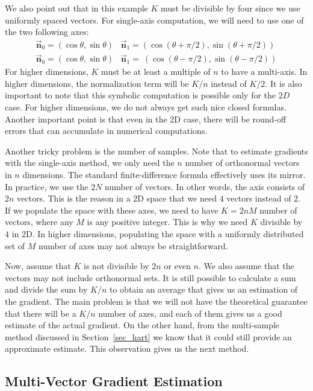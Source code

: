 \documentclass{article}
\begin{document}
We also point out that in this example $K$ must be divisible by four since we use uniformly spaced vectors. For single-axis computation, we will need to use one of the two following axes:
\begin{eqnarray}
\vec{\mathbf{n}}_0 = \left(\cos \theta, \sin \theta \right) \; \; \; \vec{\mathbf{n}}_1 =\left( \cos (\theta+\pi/2), \sin (\theta+\pi/2) \right) \nonumber \\
\vec{\mathbf{n}}_0 =\left( \cos \theta, \sin \theta \right) \; \; \; \vec{\mathbf{n}}_1 =\ \left( \cos (\theta-\pi/2), \sin (\theta-\pi/2) \right)
\end{eqnarray} 
For higher dimensions, $K$ must be at least a multiple of $n$ to have a multi-axis. In higher dimensions, the normalization term will be $K/n$ instead of $K/2$. It is also important to note that this symbolic computation is possible only for the $2D$ case. For higher dimensions, we do not always get such nice closed formulas. Another important point is that even in the 2D case, there will be round-off errors that can accumulate in numerical computations. 

Another tricky problem is the number of samples. Note that to estimate gradients with the single-axis method, we only need the $n$ number of orthonormal vectors in $n$ dimensions. The standard finite-difference formula effectively uses its mirror. In practice, we use the $2N$ number of vectors. In other words, the axis consists of $2n$ vectors.  This is the reason in a 2D space that we need $4$ vectors instead of $2$. If we populate the space with these axes, we need to have $K=2n M$ number of vectors, where any $M$ is any positive integer. This is why we need $K$ divisible by $4$ in 2D. In higher dimensions, populating the space with a uniformly distributed set of $M$ number of axes may not always be straightforward. 

Now, assume that $K$ is not divisible by $2n$ or even $n$. We also assume that the vectors may not include orthonormal sets. It is still possible to calculate a sum and divide the sum by $K/n$ to obtain an average that gives us an estimation of the gradient. The main problem is that we will not have the theoretical guarantee that there will be a $K/n$ number of axes, and each of them gives us a good estimate of the actual gradient. On the other hand, from the multi-sample method discussed in Section~\ref{sec_hart} we know that it could still provide an approximate estimate. This observation gives us the next method. 

\subsection{Multi-Vector Gradient Estimation}
\end{document}
